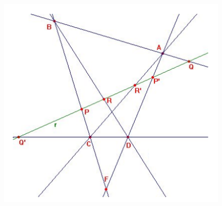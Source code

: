 \documentclass[12pt]{report}
\theoremstyle{definition}
\theoremstyle{definition}
\theoremstyle{remark}
\begin{document}
\begin{figure}[h]
\includegraphics[scale = 0.6]{2.8_2}
\centering
\end{figure}
\end{document}
